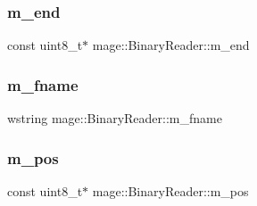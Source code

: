 \hypertarget{classmage_1_1_binary_reader_a929b6480629014c24263ec3042b1f364}{}\label{classmage_1_1_binary_reader_a929b6480629014c24263ec3042b1f364} 
\subsubsection{\texorpdfstring{m\+\_\+end}{m\_end}}
{\footnotesize\ttfamily const uint8\+\_\+t$\ast$ mage\+::\+Binary\+Reader\+::m\+\_\+end\hspace{0.3cm}{\ttfamily [private]}}

\hypertarget{classmage_1_1_binary_reader_a9c97c02d53ce60a9952751ad4f55414f}{}\label{classmage_1_1_binary_reader_a9c97c02d53ce60a9952751ad4f55414f} 
\subsubsection{\texorpdfstring{m\+\_\+fname}{m\_fname}}
{\footnotesize\ttfamily wstring mage\+::\+Binary\+Reader\+::m\+\_\+fname\hspace{0.3cm}{\ttfamily [private]}}

\hypertarget{classmage_1_1_binary_reader_a086c8b8615dddb15a97acf657bb4d73b}{}\label{classmage_1_1_binary_reader_a086c8b8615dddb15a97acf657bb4d73b} 
\subsubsection{\texorpdfstring{m\+\_\+pos}{m\_pos}}
{\footnotesize\ttfamily const uint8\+\_\+t$\ast$ mage\+::\+Binary\+Reader\+::m\+\_\+pos\hspace{0.3cm}{\ttfamily [private]}}


